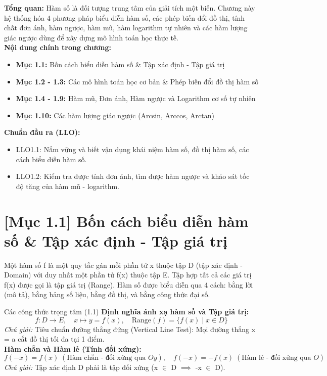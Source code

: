 \documentclass[11pt,a4paper,oneside]{book}
\begin{document}
\begin{tcolorbox}[colback=slate!5!white,colframe=slate!75!black,title={\textbf{Mục lục Chương 1 \& Chuẩn đầu ra (Buổi 1)}}]
\textbf{Tổng quan:} Hàm số là đối tượng trung tâm của giải tích một biến. Chương này hệ thống hóa 4 phương pháp biểu diễn hàm số, các phép biến đổi đồ thị, tính chất đơn ánh, hàm ngược, hàm mũ, hàm logarithm tự nhiên và các hàm lượng giác ngược dùng để xây dựng mô hình toán học thực tế.\\[6pt]
\textbf{Nội dung chính trong chương:}
\begin{itemize}[leftmargin=1.5em, itemsep=2pt]
  \item \textbf{Mục 1.1:} Bốn cách biểu diễn hàm số \& Tập xác định - Tập giá trị
  \item \textbf{Mục 1.2 - 1.3:} Các mô hình toán học cơ bản \& Phép biến đổi đồ thị hàm số
  \item \textbf{Mục 1.4 - 1.9:} Hàm mũ, Đơn ánh, Hàm ngược và Logarithm cơ số tự nhiên
  \item \textbf{Mục 1.10:} Các hàm lượng giác ngược (Arcsin, Arccos, Arctan)
\end{itemize}
\textbf{Chuẩn đầu ra (LLO):}
\begin{itemize}[leftmargin=1.5em, itemsep=2pt]
  \item LLO1.1: Nắm vững và biết vận dụng khái niệm hàm số, đồ thị hàm số, các cách biểu diễn hàm số.
  \item LLO1.2: Kiểm tra được tính đơn ánh, tìm được hàm ngược và khảo sát tốc độ tăng của hàm mũ - logarithm.
\end{itemize}
\end{tcolorbox}

\section{[Mục 1.1] Bốn cách biểu diễn hàm số \& Tập xác định - Tập giá trị}
Một hàm số f là một quy tắc gán mỗi phần tử x thuộc tập D (tập xác định - Domain) với duy nhất một phần tử f(x) thuộc tập E. Tập hợp tất cả các giá trị f(x) được gọi là tập giá trị (Range). Hàm số được biểu diễn qua 4 cách: bằng lời (mô tả), bằng bảng số liệu, bằng đồ thị, và bằng công thức đại số.

\begin{congthuc}{Các công thức trọng tâm (1.1)}
\noindent\textbf{Định nghĩa ánh xạ hàm số và Tập giá trị:}
\[ f: D \to E, \quad x \mapsto y = f(x), \quad \text{Range}(f) = \{f(x) \mid x \in D\} \]
\noindent\textit{Chú giải:} Tiêu chuẩn đường thẳng đứng (Vertical Line Test): Mọi đường thẳng x = a cắt đồ thị tối đa tại 1 điểm.\\[4pt]
\noindent\textbf{Hàm chẵn và Hàm lẻ (Tính đối xứng):}
\[ f(-x) = f(x) \;(\text{Hàm chẵn - đối xứng qua } Oy), \quad f(-x) = -f(x) \;(\text{Hàm lẻ - đối xứng qua } O) \]
\noindent\textit{Chú giải:} Tập xác định D phải là tập đối xứng (x $\in$ D $\implies$ -x $\in$ D).\\[4pt]
\end{congthuc}
\end{document}
